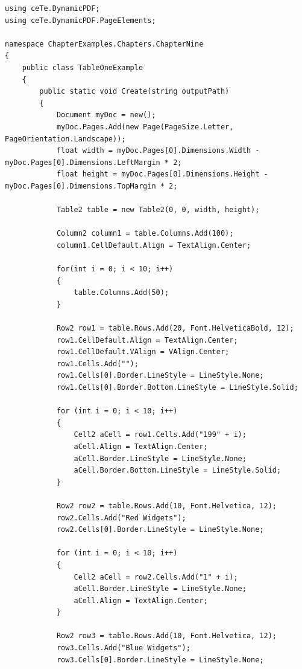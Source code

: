 \documentclass[american,letterpaper]{tufte-book}
\numberwithin{equation}{section}
\numberwithin{figure}{section}
\begin{document}
{\bgroup{}
\begin{lstlisting}[caption={A basic table.},label={lis:A-basic-table.},basicstyle={\small\ttfamily},breaklines=true]
using ceTe.DynamicPDF;
using ceTe.DynamicPDF.PageElements;

namespace ChapterExamples.Chapters.ChapterNine
{
    public class TableOneExample
    {
        public static void Create(string outputPath)
        {
            Document myDoc = new();
            myDoc.Pages.Add(new Page(PageSize.Letter, PageOrientation.Landscape));
            float width = myDoc.Pages[0].Dimensions.Width - myDoc.Pages[0].Dimensions.LeftMargin * 2;
            float height = myDoc.Pages[0].Dimensions.Height - myDoc.Pages[0].Dimensions.TopMargin * 2;

            Table2 table = new Table2(0, 0, width, height);

            Column2 column1 = table.Columns.Add(100);
            column1.CellDefault.Align = TextAlign.Center;
           
            for(int i = 0; i < 10; i++)
            {
                table.Columns.Add(50);
            }

            Row2 row1 = table.Rows.Add(20, Font.HelveticaBold, 12);
            row1.CellDefault.Align = TextAlign.Center;
            row1.CellDefault.VAlign = VAlign.Center;
            row1.Cells.Add("");
            row1.Cells[0].Border.LineStyle = LineStyle.None;
            row1.Cells[0].Border.Bottom.LineStyle = LineStyle.Solid;

            for (int i = 0; i < 10; i++)
            {
                Cell2 aCell = row1.Cells.Add("199" + i);
                aCell.Align = TextAlign.Center;
                aCell.Border.LineStyle = LineStyle.None;
                aCell.Border.Bottom.LineStyle = LineStyle.Solid;
            }

            Row2 row2 = table.Rows.Add(10, Font.Helvetica, 12);
            row2.Cells.Add("Red Widgets");
            row2.Cells[0].Border.LineStyle = LineStyle.None;

            for (int i = 0; i < 10; i++)
            {
                Cell2 aCell = row2.Cells.Add("1" + i);
                aCell.Border.LineStyle = LineStyle.None;
                aCell.Align = TextAlign.Center;
            }

            Row2 row3 = table.Rows.Add(10, Font.Helvetica, 12);
            row3.Cells.Add("Blue Widgets");
            row3.Cells[0].Border.LineStyle = LineStyle.None;


\end{lstlisting}}
\end{document}
